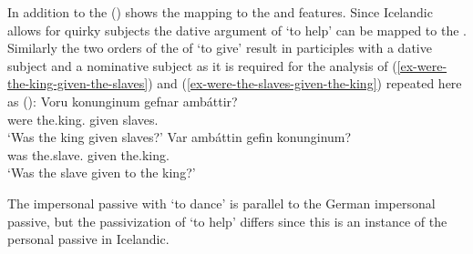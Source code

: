 \ea\label{da-repr-hm-Icelandic-two}
\z
In addition to the \argstl () shows the mapping to the \spr and \comps features. Since
Icelandic allows for quirky subjects the dative argument of `to help' can be mapped to the
\sprl \citep[--148]{Wechsler95a-u}. Similarly the two orders of the \argst of `to give' result in participles with a dative
subject and a nominative subject as it is required for the analysis of (\ref{ex-were-the-king-given-the-slaves}) and (\ref{ex-were-the-slaves-given-the-king}) repeated
here as ():
\eal
\ex\label{ex-were-the-king-given-the-slaves-two}
\gll Voru konunginum gefnar ambáttir?\\
     were the.king.\DAT{} given slaves.\NOM{}\\
\glt `Was the king given slaves?'
\ex\label{ex-were-the-slaves-given-the-king-two}
\gll Var ambáttin gefin konunginum?\\
     was the.slave.\NOM{} given the.king.\DAT\\
\glt `Was the slave given to the king?'
\zl

The impersonal passive with `to dance' is parallel to the German impersonal passive, but the
passivization of `to help' differs since this is an instance of the personal passive in Icelandic.


